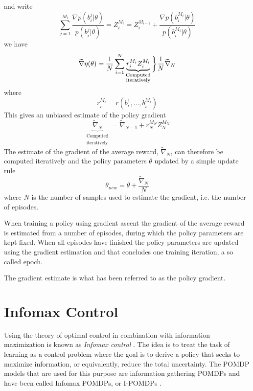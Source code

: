 and write
\begin{equation}
  \sum_{j=1}^{M_i} \frac{\nabla p(b_i^j | \theta)}{p(b_i^j | \theta)} = Z_i^{M_i} = Z_i^{M_{i-1}}  + \frac{\nabla p(b_i^{M_i} | \theta)}{p(b_i^{M_i} | \theta)}
\end{equation}
we have
\begin{equation}
  \widetilde{\nabla} \eta(\theta) = \frac{1}{N} \sum_{i=1}^N \underbrace{r_i^{M_i} Z_i^{M_i}}_{\substack{\text{Computed} \\ \text{iteratively}}} \bigg{\}} \frac{1}{N} \widetilde{\nabla}_N
\end{equation}
where
\begin{equation}
  r_i^{M_{i}} = r(b_i^1, \dotsc, b_i^{M_i})
\end{equation}
This gives an unbiased estimate of the policy gradient
\begin{equation}
  \label{eq:GradientEstimate}
  \underbrace{\widetilde{\nabla}_N}_{\substack{\text{Computed} \\ \text{iteratively}}} = \widetilde{\nabla}_{N-1} + r_N^{M_N} Z_N^{M_N}
\end{equation}
The estimate of the gradient of the average reward, $\widetilde{\nabla}_N$, can therefore be computed iteratively and the policy parameters $\theta$ updated by a simple update rule 
\begin{equation}
\label{eq:PolicyGradient}
  \theta_{new} = \theta + \frac{\widetilde{\nabla}_N}{N}
\end{equation}
where $N$ is the number of samples used to estimate the gradient, i.e. the number of episodes.

When training a policy using gradient ascent the gradient of the average reward is estimated from a number of episodes, during which the policy parameters are kept fixed. When all episodes have finished the policy parameters are updated using the gradient estimation and that concludes one training iteration, a so called epoch.

The gradient estimate is what has been referred to as the policy gradient.

\section{Infomax Control}
Using the theory of optimal control in combination with information maximization is known as \emph{Infomax control} \cite{Movellan2005}. The idea is to treat the task of learning as a control problem where the goal is to derive a policy that seeks to maximize information, or equivalently, reduce the total uncertainty. The POMDP models that are used for this purpose are information gathering POMDPs and have been called Infomax POMDPs, or I-POMDPs \cite{Butko2010b}.

